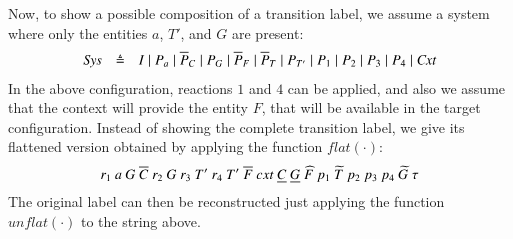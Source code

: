Now, to show a possible composition of a transition label, we assume a system where only the entities $a$, $T'$, and $G$ are present:
\[
\begin{array}{lcl}
\mathit{Sys} &\defeq &%
I\mid P_a\mid \overline{P}_C\mid P_G\mid \overline{P}_F \mid \overline{P}_T \mid P_{T'} \mid P_1 \mid P_2 \mid P_3 \mid P_4 \mid \mathit{Cxt}
\end{array}
\]
In the above configuration, reactions $1$ and $4$ can be applied, and also we assume that the context will provide the entity $F$, that will be available in the target configuration.
Instead of showing the complete transition label, we give its flattened version obtained by applying the function $\mathit{flat}(\cdot)$:
\[
r_1~ a~G~\overline{C}~ r_2~ G~ r_3~T'~r_4~T'~\overline{F}~cxt~\underline{C}~\underline{G}~\widehat{F}~p_1~\widetilde{T}~p_2~p_3~p_4~\widetilde{G}~\tau
\]
The original label can then be reconstructed just applying the function $\mathit{unflat}(\cdot)$ to the string above.


